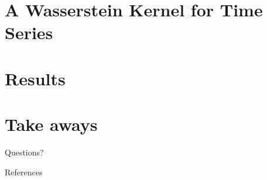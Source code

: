 \documentclass[10pt]{beamer}
\begin{document}

\section{A Wasserstein Kernel for Time Series}
	

\section{Results}


\section{Take aways}



\begin{frame}[standout]
  Questions?
\end{frame}

\begin{frame}[allowframebreaks]{References}

  
  

\end{frame}

\appendix
\end{document}
